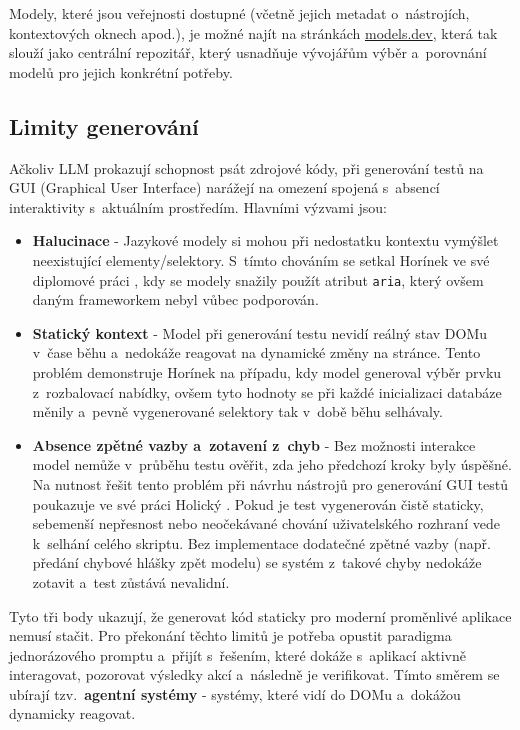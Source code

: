 \documentclass[czech, ing, kiv, he, iso690numb, viewonly]{fasthesis}
\begin{document}
Modely, které jsou veřejnosti dostupné (včetně jejich metadat o~nástrojích, kontextových oknech apod.), je možné najít na stránkách \href{https://models.dev/}{models.dev}, 
která tak slouží jako centrální repozitář, který usnadňuje vývojářům výběr a~porovnání modelů pro jejich konkrétní potřeby.

\subsection{Limity generování}

Ačkoliv LLM prokazují schopnost psát zdrojové kódy, při generování testů na GUI (Graphical User Interface) narážejí na omezení spojená s~absencí interaktivity s~aktuálním prostředím. Hlavními výzvami jsou:

\begin{itemize}
    \item \textbf{Halucinace} - Jazykové modely si mohou při nedostatku kontextu vymýšlet neexistující elementy/selektory. S~tímto chováním 
    se setkal Horínek ve své diplomové práci \cite{HORINEK2024thesis}, kdy se modely snažily použít atribut \texttt{aria}, který ovšem daným frameworkem nebyl vůbec podporován.
    
    \item \textbf{Statický kontext} - Model při generování testu nevidí reálný stav DOMu v~čase běhu a~nedokáže reagovat na dynamické změny na stránce. Tento problém 
    demonstruje Horínek \cite{HORINEK2024thesis} na případu, kdy model generoval výběr prvku z~rozbalovací nabídky, ovšem tyto hodnoty se při každé inicializaci databáze měnily a~pevně vygenerované selektory 
    tak v~době běhu selhávaly.
    
    \item \textbf{Absence zpětné vazby a~zotavení z~chyb} - Bez možnosti interakce model nemůže v~průběhu testu ověřit, zda jeho předchozí kroky byly úspěšné. 
    Na nutnost řešit tento problém při návrhu nástrojů pro generování GUI testů poukazuje ve své práci Holický \cite{HOLICKY2025thesis}. 
    Pokud je test vygenerován čistě staticky, sebemenší nepřesnost nebo neočekávané chování uživatelského rozhraní vede k~selhání celého skriptu. Bez implementace dodatečné zpětné vazby (např. předání chybové hlášky zpět modelu) se systém z~takové chyby nedokáže zotavit a~test zůstává nevalidní.
    
\end{itemize}

Tyto tři body ukazují, že generovat kód staticky pro moderní proměnlivé aplikace nemusí stačit. Pro překonání těchto limitů 
je potřeba opustit paradigma jednorázového promptu a~přijít s~řešením, které dokáže s~aplikací aktivně interagovat, pozorovat výsledky akcí a~následně je verifikovat.
Tímto směrem se ubírají tzv.~\textbf{agentní systémy} - systémy, které vidí do DOMu a~dokážou dynamicky reagovat.
\end{document}
